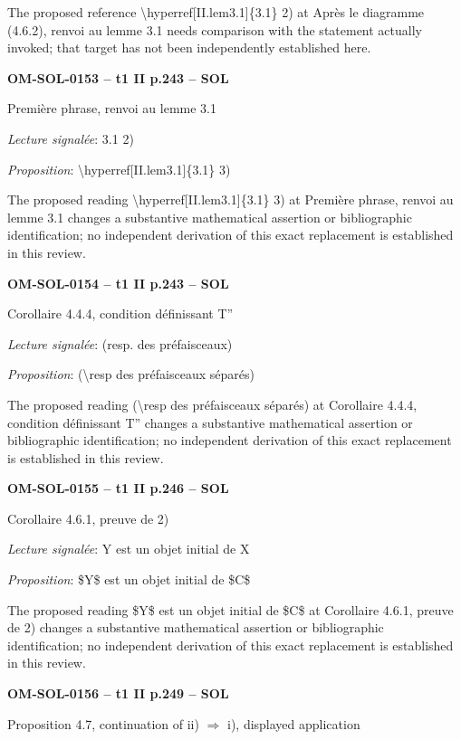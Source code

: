 The proposed reference \textbackslash{}hyperref[II.lem3.1]\{3.1\} 2) at Après le diagramme (4.6.2), renvoi au lemme 3.1 needs comparison with the statement actually invoked; that target has not been independently established here.\par
\par\noindent\textbf{OM-SOL-0153 -- t1 II p.243 -- SOL}\par
Première phrase, renvoi au lemme 3.1\par
\emph{Lecture signalée}: 3.1 2)\par
\emph{Proposition}: \textbackslash{}hyperref[II.lem3.1]\{3.1\} 3)\par
The proposed reading \textbackslash{}hyperref[II.lem3.1]\{3.1\} 3) at Première phrase, renvoi au lemme 3.1 changes a substantive mathematical assertion or bibliographic identification; no independent derivation of this exact replacement is established in this review.\par
\par\noindent\textbf{OM-SOL-0154 -- t1 II p.243 -- SOL}\par
Corollaire 4.4.4, condition définissant T''\par
\emph{Lecture signalée}: (resp. des préfaisceaux)\par
\emph{Proposition}: (\textbackslash{}resp des préfaisceaux séparés)\par
The proposed reading (\textbackslash{}resp des préfaisceaux séparés) at Corollaire 4.4.4, condition définissant T'' changes a substantive mathematical assertion or bibliographic identification; no independent derivation of this exact replacement is established in this review.\par
\par\noindent\textbf{OM-SOL-0155 -- t1 II p.246 -- SOL}\par
Corollaire 4.6.1, preuve de 2)\par
\emph{Lecture signalée}: Y est un objet initial de X\par
\emph{Proposition}: \$Y\$ est un objet initial de \$C\$\par
The proposed reading \$Y\$ est un objet initial de \$C\$ at Corollaire 4.6.1, preuve de 2) changes a substantive mathematical assertion or bibliographic identification; no independent derivation of this exact replacement is established in this review.\par
\par\noindent\textbf{OM-SOL-0156 -- t1 II p.249 -- SOL}\par
Proposition 4.7, continuation of ii) \ensuremath{\Rightarrow} i), displayed application\par
